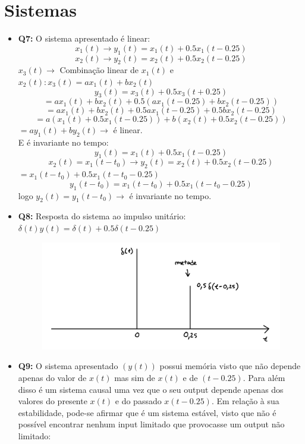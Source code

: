 \documentclass[a4paper, 12pt]{article}
\begin{document}
\section{Sistemas}
\begin{itemize}
    \item \textbf{Q7:} O sistema apresentado é linear:
          \[x_1(t) \to y_1(t) = x_1(t) + 0.5x_1(t - 0.25)\]
          \[x_2(t) \to y_2(t) = x_2(t) + 0.5x_2(t - 0.25)\]
          $x_3(t) \to$ Combinação linear de $x_1(t)$ e $x_2(t) : x_3(t) = ax_1(t) + bx_2(t)$\vspace{-5px}
          \[y_3(t) = x_3(t) + 0.5x_3(t + 0.25)\]
          \[= ax_1(t) + bx_2(t  ) + 0.5(ax_1(t - 0.25) + bx_2(t - 0.25))\]
          \[= ax_1(t) + bx_2(t) + 0.5ax_1(t - 0.25) + 0.5bx_2(t - 0.25)\]
          \[= a(x_1(t) + 0.5x_1(t - 0.25)) + b(x_2(t) + 0.5x_2(t- 0.25))\]
          \hspace{105px}$= ay_1(t) + by_2(t) \to$ é linear.\\\vspace{-9px}
          E é invariante no tempo:
          \[y_1(t) = x_1(t) + 0.5x_1(t - 0.25)\]
          \[x_2(t) = x_1(t - t_0) \to y_2(t) = x_2(t) + 0.5x_2(t - 0.25)\]
          \hspace{184px}$= x_1(t - t_0) + 0.5x_1(t- t_0 - 0.25)$
          \[y_1(t - t_0) = x_1(t - t_0) + 0.5x_1(t - t_0 - 0.25)\]
          \hspace{57px}logo $y_2(t) = y_1(t - t_0) \to$ é invariante no tempo.
    \item \textbf{Q8:} Resposta do sistema ao impulso unitário: $\delta(t)y(t) = \delta(t) + 0.5\delta(t - 0.25)$
          \begin{figure}[!ht]
              \includegraphics[width=12cm]{images/Graf3.png}
          \end{figure}
    \item \textbf{Q9:} O sistema apresentado $(y(t))$ possui memória visto que não depende apenas do valor de $x(t)$ mas sim de $x(t)$ e de $(t - 0.25)$. Para além disso é um sistema causal uma vez que o seu output depende apenas dos valores do presente $x(t)$ e do passado $x(t - 0.25)$. Em relação à sua estabilidade, pode-se afirmar que é um sistema estável, visto que não é possível encontrar nenhum input limitado que provocasse um output não limitado:\\

\end{itemize}
\end{document}
